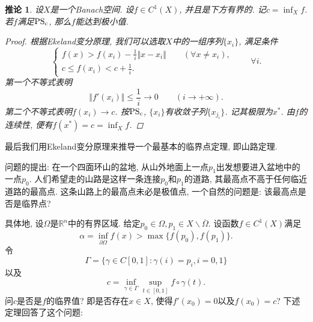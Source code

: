 \documentclass[12pt,a4paper]{article}
\newtheorem{corollary}[theorem]{推论}
\begin{document}
\begin{corollary}
    设$X$是一个Banach空间. 设$f \in C^1(X)$, 并且是下方有界的. 记$c = \inf_Xf$.
    若$f$满足${\rm PS_c}$, 那么$f$能达到极小值.
    \begin{proof}
        根据Ekeland变分原理, 我们可以选取$X$中的一组序列$\{x_i\}$, 满足条件 
        \begin{equation*}
            \begin{cases}
                \displaystyle f(x) > f(x_i) - \frac{1}{i}\Vert x - x_i\Vert \qquad (\forall x \neq x_i), \\ 
                \displaystyle c \leq f(x_i) < c + \frac{1}{i}.
            \end{cases}
            \qquad \forall i.
        \end{equation*}
        第一个不等式表明 
        \begin{equation*}
            \Vert f'(x_i) \Vert \leq \frac{1}{i} \rightarrow 0 \qquad (i \rightarrow +\infty).
        \end{equation*}
        第二个不等式表明$f(x_i) \rightarrow c$. 按${\rm PS_c}$, $\{x_i\}$有收敛子列$\{x_{j_i}\}$.
        记其极限为$x^*$. 由$f$的连续性, 便有$f(x^*) = c = \inf_Xf$.
    \end{proof}
\end{corollary}

最后我们用Ekeland变分原理来推导一个最基本的临界点定理, 即山路定理.

问题的提出: 在一个四面环山的盆地, 从山外地面上一点$p_1$出发想要进入盆地中的一点$p_0$.
人们希望走的山路是这样一条连接$p_0$和$p_1$的道路, 其最高点不高于任何临近道路的最高点.
这条山路上的最高点未必是极值点, 一个自然的问题是: 该最高点是否是临界点?

具体地, 设$\Omega$是$\mathbb{R}^n$中的有界区域. 给定$p_0 \in \Omega, p_1 \in X \smallsetminus \overline{\Omega}$.
设函数$f \in C^1(X)$满足 
\begin{equation}\label{51}
    \alpha = \inf_{\partial\Omega}f(x) > \max\{f(p_0), f(p_1)\}.
\end{equation}
令 
\begin{equation}\label{52}
    \Gamma = \{\gamma \in C[0, 1]\colon \gamma(i) = p_i, i = 0, 1\}
\end{equation}
以及 
\begin{equation}\label{53}
    c = \inf_{\gamma \in \Gamma}\sup_{t \in [0, 1]}f \circ \gamma(t).
\end{equation}
问$c$是否是$f$的临界值? 即是否存在$x \in X$, 使得$f'(x_0) = 0$以及$f(x_0) = c$?
下述定理回答了这个问题:
\end{document}
